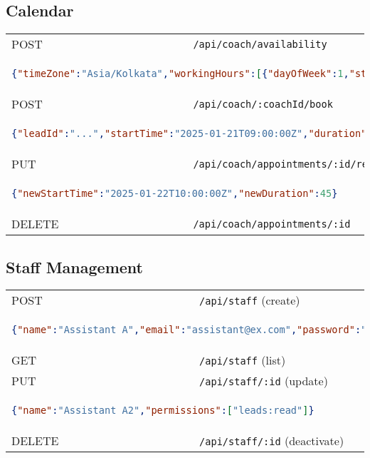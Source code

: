 \documentclass[11pt,a4paper]{article}
\begin{document}
\subsection{Calendar}
\begin{longtable}{p{2.5cm}p{10cm}}
POST & \texttt{/api/coach/availability} \\
\multicolumn{2}{p{13cm}}{\begin{lstlisting}[language=json]
{"timeZone":"Asia/Kolkata","workingHours":[{"dayOfWeek":1,"startTime":"09:00","endTime":"17:00"}],"unavailableSlots":[],"slotDuration":30,"bufferTime":0}
\end{lstlisting}} \\
POST & \texttt{/api/coach/:coachId/book} \\
\multicolumn{2}{p{13cm}}{\begin{lstlisting}[language=json]
{"leadId":"...","startTime":"2025-01-21T09:00:00Z","duration":30,"notes":"Intro call","timeZone":"Asia/Kolkata"}
\end{lstlisting}} \\
PUT & \texttt{/api/coach/appointments/:id/reschedule} \\
\multicolumn{2}{p{13cm}}{\begin{lstlisting}[language=json]
{"newStartTime":"2025-01-22T10:00:00Z","newDuration":45}
\end{lstlisting}} \\
DELETE & \texttt{/api/coach/appointments/:id} \\
\end{longtable}

\subsection{Staff Management}
\begin{longtable}{p{2.5cm}p{10cm}}
POST & \texttt{/api/staff} (create) \\
\multicolumn{2}{p{13cm}}{\begin{lstlisting}[language=json]
{"name":"Assistant A","email":"assistant@ex.com","password":"Passw0rd!","permissions":["leads:read","leads:update"]}
\end{lstlisting}} \\
GET & \texttt{/api/staff} (list) \\
PUT & \texttt{/api/staff/:id} (update) \\
\multicolumn{2}{p{13cm}}{\begin{lstlisting}[language=json]
{"name":"Assistant A2","permissions":["leads:read"]}
\end{lstlisting}} \\
DELETE & \texttt{/api/staff/:id} (deactivate) \\
\end{longtable}
\end{document}
